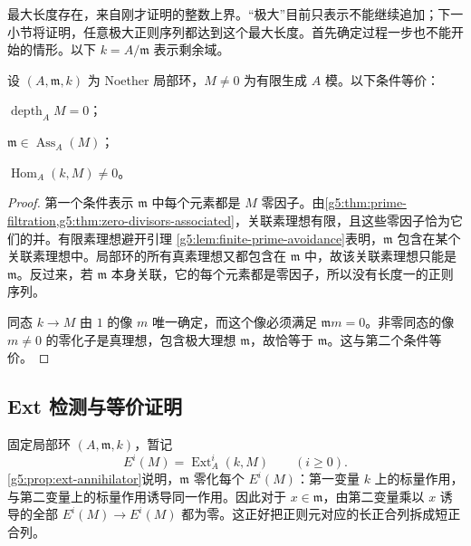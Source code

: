 最大长度存在，来自刚才证明的整数上界。“极大”目前只表示不能继续追加；下一小节将证明，任意极大正则序列都达到这个最大长度。首先确定过程一步也不能开始的情形。以下 \(k=A/\mathfrak m\) 表示剩余域。

\begin{lemma}\label{g5:lem:depth-zero}
	设 \((A,\mathfrak m,k)\) 为 Noether 局部环，\(M\ne0\) 为有限生成 \(A\) 模。以下条件等价：
	\begin{equivalences}
		\item \(\operatorname{depth}_A M=0\)；
		\item \(\mathfrak m\in\operatorname{Ass}_A(M)\)；
		\item \(\operatorname{Hom}_A(k,M)\ne0\)。
	\end{equivalences}
\end{lemma}
\begin{proof}
	第一个条件表示 \(\mathfrak m\) 中每个元素都是 \(M\) 零因子。由\cref{g5:thm:prime-filtration,g5:thm:zero-divisors-associated}，关联素理想有限，且这些零因子恰为它们的并。有限素理想避开引理 \cref{g5:lem:finite-prime-avoidance}表明，\(\mathfrak m\) 包含在某个关联素理想中。局部环的所有真素理想又都包含在 \(\mathfrak m\) 中，故该关联素理想只能是 \(\mathfrak m\)。反过来，若 \(\mathfrak m\) 本身关联，它的每个元素都是零因子，所以没有长度一的正则序列。

	同态 \(k\to M\) 由 \(1\) 的像 \(m\) 唯一确定，而这个像必须满足 \(\mathfrak m m=0\)。非零同态的像 \(m\ne0\) 的零化子是真理想，包含极大理想 \(\mathfrak m\)，故恰等于 \(\mathfrak m\)。这与第二个条件等价。
\end{proof}

\subsection{Ext 检测与等价证明}
\label{g5:subsec:0803:02}

固定局部环 \((A,\mathfrak m,k)\)，暂记
\[
	E^i(M)=\operatorname{Ext}^i_A(k,M)\qquad(i\geq0).
\]
\cref{g5:prop:ext-annihilator}说明，\(\mathfrak m\) 零化每个 \(E^i(M)\)：第一变量 \(k\) 上的标量作用，与第二变量上的标量作用诱导同一作用。因此对于 \(x\in\mathfrak m\)，由第二变量乘以 \(x\) 诱导的全部 \(E^i(M)\to E^i(M)\) 都为零。这正好把正则元对应的长正合列拆成短正合列。

